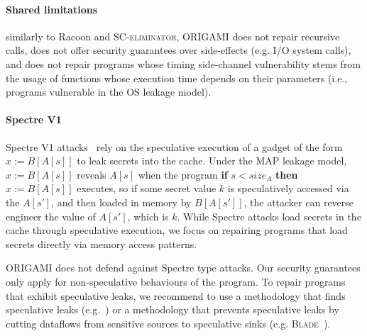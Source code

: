 \paragraph*{Shared limitations} similarly to Racoon and \textsc{SC-eliminator}, ORIGAMI does not repair recursive calls, does not offer security guarantees over side-effects (e.g. I/O system calls), and does not repair programs whose timing side-channel vulnerability stems from the usage of functions whose execution time depends on their parameters (i.e., programs vulnerable in the OS leakage model). 

\paragraph*{Spectre V1} Spectre V1 attacks~\cite{Spectre} rely on the speculative execution of a gadget of the form $x:=B[A[s]]$ to leak secrets into the cache. Under the MAP leakage model, $x:=B[A[s]]$ reveals $A[s]$ when the program \textbf{if} $s<size_A$ \textbf{then} $x:=B[A[s]]$ executes, so if some secret value $k$ is speculatively accessed via the $A[s']$, and then loaded in memory by $B[A[s']]$, the attacker can reverse engineer the value of $A[s']$, which is $k$. While Spectre attacks load secrets in the cache through speculative execution, we focus on repairing programs that load secrets directly via memory access patterns. 

ORIGAMI does not defend against Spectre type attacks. Our security guarantees only apply for non-speculative behaviours of the program. To repair programs that exhibit speculative leaks, we recommend to use a methodology that finds speculative leaks (e.g.~\cite{pitchfork}) or a methodology that prevents speculative leaks by cutting dataflows from sensitive sources to speculative sinks (e.g. \textsc{Blade}~\cite{Blade}).



